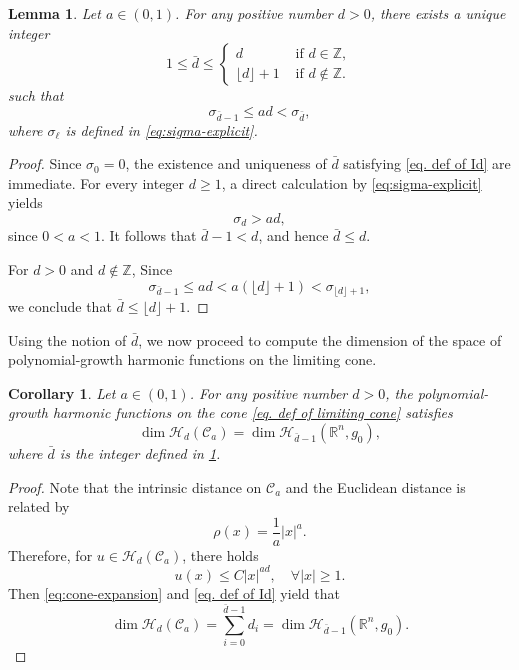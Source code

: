\documentclass[12pt]{amsart}
\theoremstyle{plain}
\newtheorem{lemma}[theorem]{Lemma}
\newtheorem{corollary}[theorem]{Corollary}
\theoremstyle{definition}
\theoremstyle{remark}     %
\numberwithin{equation}{section}
\begin{document}
{
\begin{lemma}
\label{lem:spectral-threshold}
Let $a\in(0,1)$. For  any positive number $d>0$, there exists a unique integer \begin{equation}\label{eq. Id upper bound}
    1\leq \bar{d} \leq
    \begin{cases}
         d &\text{ if } d\in\mathbb{Z},\\
         \lfloor d\rfloor+1
         &\text{ if } d\not\in\mathbb{Z}.
    \end{cases}
\end{equation}
such that
\begin{equation}\label{eq. def of Id}
    \sigma_{\bar{d}-1}\leq ad<\sigma_{\bar{d}},
\end{equation}
where  $\sigma_{\ell}$ is defined in \cref{eq:sigma-explicit}.
\end{lemma}
\begin{proof}
Since $\sigma_0=0$, the existence and uniqueness of $\bar{d}$ satisfying \cref{eq. def of Id} are immediate.
For every integer $d\geq1$, a direct calculation by \cref{eq:sigma-explicit} yields
\[
    \sigma_d>ad,
\]
since $0<a<1$.
It follows that $\bar{d}-1<d$, and hence $\bar{d}\leq d$.

For $d>0$ and $d\not\in\mathbb{Z}$,  Since
\[
    \sigma_{\bar{d}-1}\leq
    ad<a(\lfloor d\rfloor +1)<\sigma_{\lfloor d\rfloor +1},
\]
we conclude that $\bar{d}\leq \lfloor d\rfloor +1$.
\end{proof}
Using the notion of $\bar{d}$, we now proceed to compute the dimension of the space of polynomial-growth harmonic functions on the limiting cone.
\begin{corollary}\label{cor. dim of harmonic on cone}
    Let $a\in(0,1)$. For any positive number $d>0$,  the polynomial-growth harmonic functions on the cone \cref{eq. def of limiting cone}
satisfies
\[
    \dim\mathcal H_d(\mathcal{C}_a)
    = \dim\mathcal H_{\bar{d}-1}(\mathbb{R}^n,g_0),
\]
where $\bar{d}$ is the integer defined in \cref{lem:spectral-threshold}.
\end{corollary}
\begin{proof}
    Note that the intrinsic distance on $\mathcal{C}_a$ and the Euclidean distance is related by
    \[
        \rho(x)=\frac{1}{a}|x|^a.
    \]
    Therefore, for $u\in \mathcal H_d(\mathcal{C}_a)$, there holds
    \[
        u(x)\leq C|x|^{ad},\quad 
        \forall |x|\geq 1.
    \]
    Then \cref{eq:cone-expansion} and \cref{eq. def of Id} yield that
    \[
        \dim\mathcal H_d(\mathcal{C}_a)
        =\sum_{i=0}^{\bar{d}-1}d_i
        =\dim\mathcal H_{\bar{d}-1}(\mathbb{R}^n,g_0).
    \]
\end{proof}
}
\end{document}
